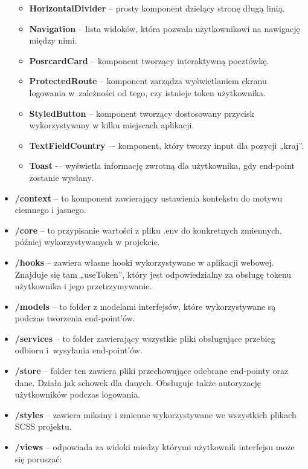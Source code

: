 \documentclass[a4paper,twoside,12pt]{book}
\begin{document}
\begin{itemize}
\begin{itemize}
            \item \textbf{HorizontalDivider} -- prosty komponent dzielący stronę długą linią.
            \item \textbf{Navigation} -- lista widoków, która pozwala użytkownikowi na nawigację między nimi.
            \item \textbf{PosrcardCard} -- komponent tworzący interaktywną pocztówkę.
            \item \textbf{ProtectedRoute} -- komponent zarządza wyświetlaniem ekranu logowania w~zależności od tego, czy istnieje token użytkownika.
            \item \textbf{StyledButton} -- komponent tworzący dostosowany przycisk wykorzystywany w kilku miejscach aplikacji.
            \item \textbf{TextFieldCountry} –- komponent, który tworzy input dla pozycji „kraj”.
            \item \textbf{Toast} -– wyświetla informację zwrotną dla użytkownika, gdy end-point zostanie wysłany.
        \end{itemize}
    \item \textbf{/context} -- to komponent zawierający ustawienia kontekstu do motywu ciemnego i jasnego.
    \item \textbf{/core} -- to przypisanie wartości z pliku .env do konkretnych zmiennych, później wykorzystywanych w projekcie.
    \item \textbf{/hooks} -- zawiera własne hooki wykorzystywane w aplikacji webowej. Znajduje się tam „useToken”, który jest odpowiedzialny za obsługę tokenu użytkownika i jego przetrzymywanie.
    \item \textbf{/models} -- to folder z modelami interfejsów, które wykorzystywane są podczas tworzenia end-point’ów.
    \item \textbf{/services} -- to folder zawierający wszystkie pliki obsługujące przebieg odbioru i~wysyłania end-point’ów.
    \item \textbf{/store} -- folder ten zawiera pliki przechowujące odebrane end-pointy oraz dane. Działa jak schowek dla danych. Obsługuje także autoryzację użytkowników podczas logowania.
    \item \textbf{/styles} -- zawiera miksiny i zmienne wykorzystywane we wszystkich plikach SCSS projektu.
    \item \textbf{/views} -- odpowiada za widoki miedzy którymi użytkownik interfejsu może się poruszać:
    \newpage
        \begin{figure}[H]
            \centering

\end{figure}
\end{itemize}
\end{document}
